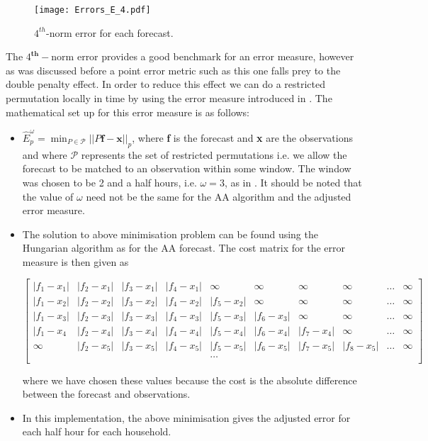 \begin{figure}
\centering
\texttt{[image: Errors\_E\_4.pdf]}
\caption{\label{fig:m4e_all} $4^{th}$-norm error for each forecast.}
\end{figure}


The $4^{\textbf{th}}-$norm error provides a good benchmark for an error measure, however as was discussed before a point error metric such as this one falls prey to the double penalty effect. In order to reduce this effect we can do a restricted permutation locally in time by using the error measure introduced in \citet{dan14}. The mathematical set up for this error measure is as follows:
\begin{itemize}
\item $\hat{E}_p^\omega = \displaystyle{\min_{P \in \mathscr{P}}||P\textbf{f}-\textbf{x}||_p}$, where \textbf{f} is the forecast and \textbf{x} are the observations and where $\mathscr{P}$ represents the set of restricted permutations i.e. we allow the forecast to be matched to an observation within some window. The window was chosen to be 2 and a half hours, i.e. $\omega = 3$, as in \cite{dan14}. It should be noted that the value of $\omega$ need not be the same for the AA algorithm and the adjusted error measure.
\item The solution to above minimisation problem can be found using the Hungarian algorithm as for the AA forecast. The cost matrix for the error measure is then given as


\centerline{$\begin{bmatrix}
    |f_1 - x_1| & |f_2 - x_1| & |f_3 - x_1| & |f_4 - x_1|  & \infty& \infty& \infty &\infty & \dots & \infty \\
    |f_1 - x_2| & |f_2 - x_2| & |f_3 - x_2| &  |f_4 - x_2| & |f_5 - x_2| & \infty  &\infty & \infty & \dots & \infty\\
    |f_1 - x_3| & |f_2 - x_3| & |f_3 - x_3| &  |f_4 - x_3|& |f_5- x_3|& |f_6 - x_3| & \infty&\infty & \dots  & \infty\\
    |f_1 - x_4 & |f_2 - x_4| & |f_3 - x_4| & |f_4 - x_4| &  |f_5 - x_4|& |f_6- x_4|& |f_7 - x_4| & \infty&\dots & \infty\\
    \infty & |f_2 - x_5| & |f_3 - x_5| & |f_4 - x_5| &  |f_5 - x_5|& |f_6- x_5|& |f_7 - x_5| & |f_8 -x_5|&\dots & \infty\\
   &&&& \dots &&&&& \\
\end{bmatrix}$}

\noindent where we have chosen these values because the cost is the absolute difference between the forecast and observations.  
\item In this implementation, the above minimisation gives the adjusted error for each half hour for each household.
\end{itemize}

